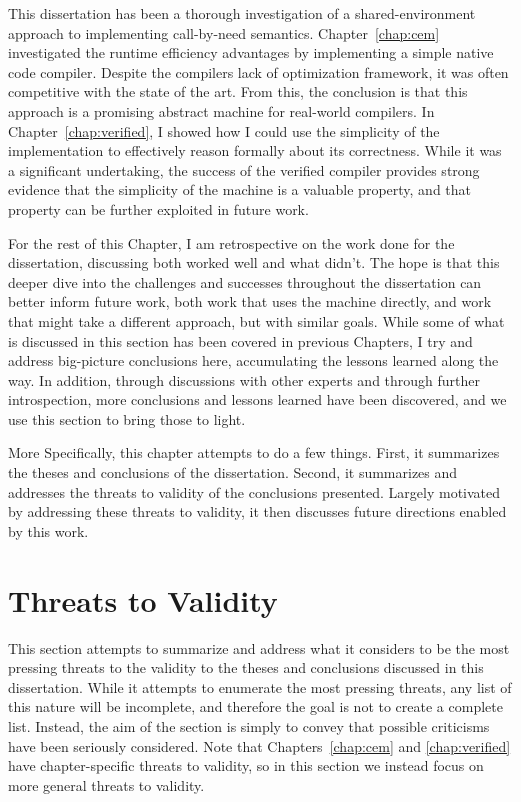 This dissertation has been a thorough investigation of a shared-environment
approach to implementing call-by-need semantics. Chapter~\ref{chap:cem} 
investigated the runtime efficiency advantages by implementing a simple native
code compiler. Despite the compilers lack of optimization framework, it was
often competitive with the state of the art. From this, the conclusion is that
this approach is a promising abstract machine for real-world compilers. In
Chapter~\ref{chap:verified}, I showed how I could use the simplicity of the
implementation to effectively reason formally about its correctness. While it
was a significant undertaking, the success of the verified compiler provides
strong evidence that the simplicity of the machine is a valuable property, and
that property can be further exploited in future work.

For the rest of this Chapter, I am retrospective on the work done for the
dissertation, discussing both worked well and what didn't. The hope is that this
deeper dive into the challenges and successes throughout the dissertation can
better inform future work, both work that uses the \ce machine directly, and
work that might take a different approach, but with similar goals. While some of
what is discussed in this section has been covered in previous Chapters, I try
and address big-picture conclusions here, accumulating the lessons learned along
the way. In addition, through discussions with other experts and through further
introspection, more conclusions and lessons learned have been discovered, and we
use this section to bring those to light. 

More Specifically, this chapter attempts to do a few things. First, it
summarizes the theses and conclusions of the dissertation. Second, it summarizes
and addresses the threats to validity of the conclusions presented.  Largely
motivated by addressing these threats to validity, it then discusses future
directions enabled by this work. 

\section{Threats to Validity}

This section attempts to summarize and address what it considers to be the most
pressing threats to the validity to the theses and conclusions discussed in this
dissertation. While it attempts to enumerate the most pressing threats, any list
of this nature will be incomplete, and therefore the goal is not to create a
complete list. Instead, the aim of the section is simply to convey that possible
criticisms have been seriously considered. Note that Chapters~\ref{chap:cem} and
\ref{chap:verified} have chapter-specific threats to validity, so in this
section we instead focus on more general threats to validity. 

